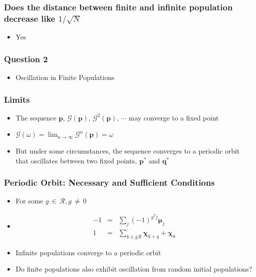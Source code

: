 \documentclass[aspectratio=169]{beamer}
\begin{document}
  \begin{frame}
    \frametitle{Does the distance between finite and infinite population decrease like $1/\sqrt{N}$}
    \begin{itemize}
      \item Yes
    \end{itemize}
  \end{frame}
  
  \begin{frame}
    \frametitle{Question 2}
    \begin{itemize}
      \item{Oscillation in Finite Populations}      
    \end{itemize}
  \end{frame}
  
  \begin{frame}
    \frametitle{Limits}
    \begin{itemize}
      \item{The sequence $\bm{p}, \, \mathcal{G}(\bm{p}), \, {\mathcal{G}}^2(\bm{p}), \, \cdots$ may converge to a fixed point }  
      \item{$\mathcal{G}(\omega) = \lim_{n\to\infty} \mathcal{G}^n(\bm{p}) = \omega$}
      \item{But under some circumstances, the sequence converges to a periodic orbit that oscillates between two fixed points, $\bm{p}^\ast$ and $\bm{q}^\ast$}
    \end{itemize}
  \end{frame}
  
  \begin{frame}
    \frametitle{Periodic Orbit: Necessary and Sufficient Conditions}
    \begin{itemize}
      \item{For some $g \,\in\, \mathcal{R} , g \,\neq\, 0$}    
      \item{
      \begin{eqnarray*}
      -1 &=& \sum \limits_{j} (-1)^{g^T j} \bm{\mu}_j \\
      1 &=& \sum \limits_{k \in \bar{g}\mathcal{R}} \bm{\chi}_{k+g} + \bm{\chi}_k 
      \end{eqnarray*}
      }
      \item{Infinite populations converge to a periodic orbit }
      \item{Do finite populations also exhibit oscillation from random initial populations?}
    \end{itemize}
  \end{frame}  
  
\end{document}
